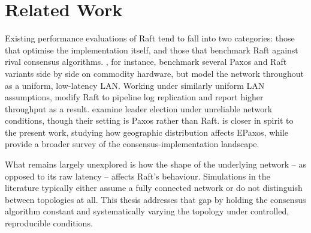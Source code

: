 \section{Related Work}

Existing performance evaluations of Raft tend to fall into two categories: those that optimise the implementation itself, and those that benchmark Raft against rival consensus algorithms. \citet{howard2020}, for instance, benchmark several Paxos and Raft variants side by side on commodity hardware, but model the network throughout as a uniform, low-latency LAN. Working under similarly uniform LAN assumptions, \citet{wang2017} modify Raft to pipeline log replication and report higher throughput as a result. \citet{larrea2018} examine leader election under unreliable network conditions, though their setting is Paxos rather than Raft. \citet{moraru2013} is closer in spirit to the present work, studying how geographic distribution affects EPaxos, while \citet{charapko2021} provide a broader survey of the consensus-implementation landscape.

What remains largely unexplored is how the shape of the underlying network -- as opposed to its raw latency -- affects Raft's behaviour. Simulations in the literature typically either assume a fully connected network or do not distinguish between topologies at all. This thesis addresses that gap by holding the consensus algorithm constant and systematically varying the topology under controlled, reproducible conditions.
